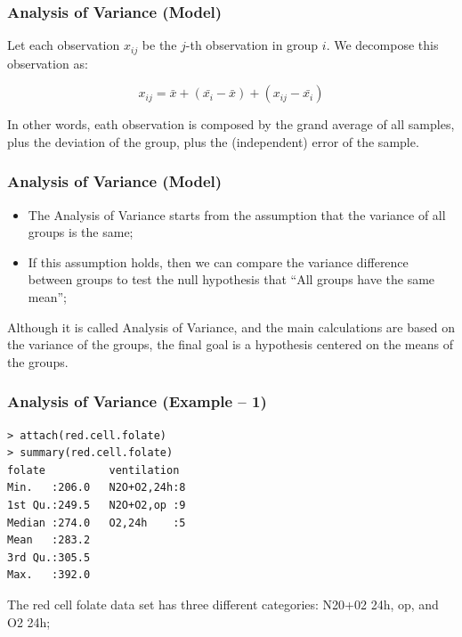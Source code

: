 \documentclass[10pt]{beamer}
\begin{document}
\begin{frame}
  \frametitle{Analysis of Variance (Model)}
  \begin{block}{}
    Let each observation $x_{ij}$ be the $j$-th observation in group
    $i$. We decompose this observation as:
  \end{block}
  \begin{equation*}
    x_{ij} = \bar{x} + (\bar{x_i} - \bar{x}) + (x_{ij} - \bar{x_i})
  \end{equation*}
  \begin{block}{}
    In other words, eath observation is composed by the grand average
    of all samples, plus the deviation of the group, plus the
    (independent) error of the sample.
  \end{block}
\end{frame}

\begin{frame}
  \frametitle{Analysis of Variance (Model)}
  \begin{itemize} 
  \item The Analysis of Variance starts from the assumption that
    the variance of all groups is the same;
  \item If this assumption holds, then we can compare the variance
    difference between groups to test the null hypothesis that
    ``All groups have the same mean'';
  \end{itemize}
  \begin{block}{}
    Although it is called Analysis of Variance, and the main
    calculations are based on the variance of the groups, the final
    goal is a hypothesis centered on the means of the groups.
  \end{block}
\end{frame}

\begin{frame}
  \frametitle{Analysis of Variance (Example -- 1)}
{\small
  \begin{block}{}
\begin{verbatim}
> attach(red.cell.folate)
> summary(red.cell.folate)
folate          ventilation
Min.   :206.0   N2O+O2,24h:8   
1st Qu.:249.5   N2O+O2,op :9   
Median :274.0   O2,24h    :5   
Mean   :283.2                  
3rd Qu.:305.5                  
Max.   :392.0
\end{verbatim}
  \end{block}}

The red cell folate data set has three different categories: N20+02 24h, op, and O2 24h;

\end{frame}
\end{document}
